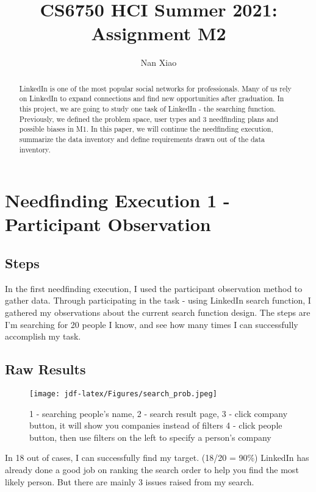 \documentclass[
	letterpaper, %
]{jdf}
\author{Nan Xiao}
\title{CS6750 HCI Summer 2021:\\Assignment M2}
\begin{document}

\maketitle

\begin{abstract}
	LinkedIn is one of the most popular social networks for professionals. Many of us rely on LinkedIn to expand connections and find new opportunities after graduation. In this project, we are going to study one task of LinkedIn - the searching function. Previously, we defined the problem space, user types and 3 needfinding plans and possible biases in M1. In this paper, we will continue the needfinding execution, summarize the data inventory and define requirements drawn out of the data inventory.
\end{abstract}

\section{Needfinding Execution 1 - Participant Observation}
\subsection{Steps}
In the first needfinding execution, I used the participant observation method to gather data. Through participating in the task - using LinkedIn search function, I gathered my observations about the current search function design. The steps are I'm searching for 20 people I know, and see how many times I can successfully accomplish my task.

\subsection{Raw Results}
\begin{figure}[h]
	\centering
	\texttt{[image: jdf-latex/Figures/search\_prob.jpeg]}
	\caption{1 - searching people's name, 2 - search result page, 3 - click company button, it will show you companies instead of filters 4 - click people button, then use filters on the left to specify a person's company}
	\label{fig:search_prob}
\end{figure}

In 18 out of cases, I can successfully find my target. (18/20 = 90\%) LinkedIn has already done a good job on ranking the search order to help you find the most likely person. But there are mainly 3 issues raised from my search.
\end{document}

